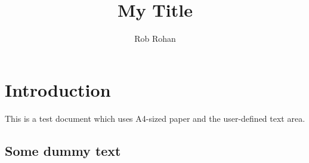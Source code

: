 \documentclass{article}
\author{Rob Rohan}
\title{My Title}
\begin{document}
	\maketitle

	\section{Introduction}
	This is a test document which uses A4-sized paper and the user-defined text area. 
	\subsection{Some dummy text}
	\blindtext[8]
\end{document}
